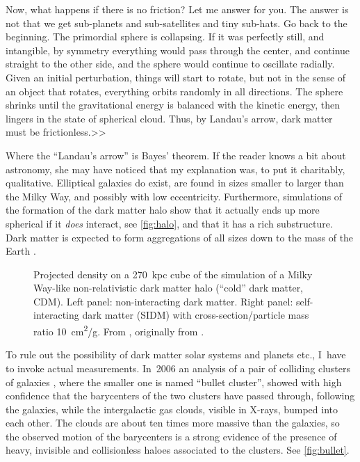 Now, what happens if there is no friction? Let me answer for you. The answer is
not that we get sub-planets and sub-satellites and tiny sub-hats. Go back to
the beginning. The primordial sphere is collapsing. If it was perfectly still,
and intangible, by symmetry everything would pass through the center, and
continue straight to the other side, and the sphere would continue to oscillate
radially. Given an initial perturbation, things will start to rotate, but not
in the sense of an object that rotates, everything orbits randomly in all
directions. The sphere shrinks until the gravitational energy is balanced with
the kinetic energy, then lingers in the state of spherical cloud. Thus, by
Landau's arrow, dark matter must be frictionless.>>

Where the ``Landau's arrow'' is Bayes' theorem. If the reader knows a bit about
astronomy, she may have noticed that my explanation was, to put it charitably,
qualitative. Elliptical galaxies do exist, are found in sizes smaller to larger
than the Milky Way, and possibly with low eccentricity. Furthermore,
simulations of the formation of the dark matter halo show that it actually ends
up more spherical if it \emph{does} interact, see \autoref{fig:halo}, and that
it has a rich substructure. Dark matter is expected to form aggregations of all
sizes down to the mass of the Earth \cite[1]{vogelsberger2012}.

\begin{figure}
    
    
    \caption{\label{fig:halo} Projected density on a \SI{270}{kpc} cube of the
    simulation of a Milky Way-like non-relativistic dark matter halo (``cold''
    dark matter, CDM). Left panel: non-interacting dark matter. Right panel:
    self-interacting dark matter (SIDM) with cross-section/particle mass ratio
    \SI{10}{cm^2/g}. From \cite[21]{tulin2017}, originally from
    \cite[6]{vogelsberger2012}.}
    
\end{figure}

To rule out the possibility of dark matter solar systems and planets etc.,
I~have to invoke actual measurements. In~2006 an analysis of a pair of
colliding clusters of galaxies \cite{clowe2006}, where the smaller one is named
``bullet cluster'', showed with high confidence that the barycenters of the two
clusters have passed through, following the galaxies, while the intergalactic
gas clouds, visible in X-rays, bumped into each other. The clouds are about ten
times more massive than the galaxies, so the observed motion of the barycenters
is a strong evidence of the presence of heavy, invisible and collisionless
haloes associated to the clusters. See \autoref{fig:bullet}.

